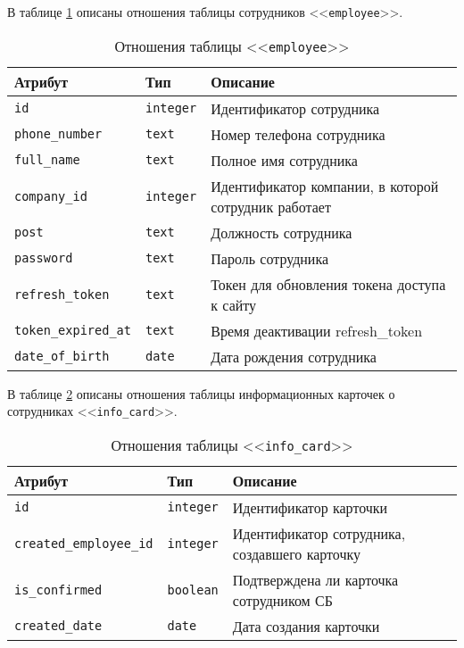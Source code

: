 \clearpage

В таблице \ref{table:employeeCols} описаны отношения таблицы сотрудников <<\texttt{employee}>>.
\begin{table}[h!]
	\begin{center}
	\caption{\label{table:employeeCols} Отношения таблицы <<\texttt{employee}>>}
		\begin{tabularx}{\textwidth}{|X|X|X|}
			\hline
			Атрибут & Тип & Описание \\ \hline
			\texttt{id} & \texttt{integer} & Идентификатор сотрудника \\ \hline
			\texttt{phone\_number} & \texttt{text} & Номер телефона сотрудника \\ \hline
			\texttt{full\_name} & \texttt{text} & Полное имя сотрудника \\ \hline
			\texttt{company\_id} & \texttt{integer} & Идентификатор компании, в которой сотрудник работает \\ \hline
			\texttt{post} & \texttt{text} & Должность сотрудника\\ \hline
			\texttt{password} & \texttt{text} & Пароль сотрудника \\ \hline
			\texttt{refresh\_token} & \texttt{text} & Токен для обновления токена доступа к сайту \\ \hline
			\texttt{token\_expired\_at} & \texttt{text} & Время деактивации refresh\_token \\ \hline
			\texttt{date\_of\_birth} & \texttt{date} & Дата рождения сотрудника \\ \hline
		\end{tabularx}
	\end{center}
\end{table}

В таблице \ref{table:infoCardCols} описаны отношения таблицы информационных карточек о сотрудниках <<\texttt{info\_card}>>.
\begin{table}[h!]
	\begin{center}
	\caption{\label{table:infoCardCols} Отношения таблицы <<\texttt{info\_card}>>}
		\begin{tabularx}{\textwidth}{|X|X|X|}
			\hline
			Атрибут & Тип & Описание \\ \hline
			\texttt{id} & \texttt{integer} & Идентификатор карточки \\ \hline
			\texttt{created\_employee\_id} & \texttt{integer} & Идентификатор сотрудника, создавшего карточку \\ \hline
			\texttt{is\_confirmed} & \texttt{boolean} & Подтверждена ли карточка сотрудником СБ \\ \hline
			\texttt{created\_date} & \texttt{date} & Дата создания карточки \\ \hline
		\end{tabularx}
	\end{center}
\end{table}

